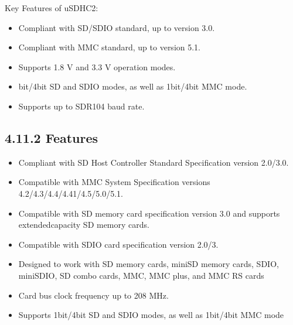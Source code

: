 \documentclass[letterpaper,10pt,openany,english]{sphinxmanual}
\begin{document}
\sphinxAtStartPar
Key Features of uSDHC2:
\begin{itemize}
\item {} 
\sphinxAtStartPar
Compliant with SD/SDIO standard, up to version 3.0.

\item {} 
\sphinxAtStartPar
Compliant with MMC standard, up to version 5.1.

\item {} 
\sphinxAtStartPar
Supports 1.8 V and 3.3 V operation modes.

\item {} 
\sphinxhyphen{}bit/4\sphinxhyphen{}bit SD and SDIO modes, as well as 1\sphinxhyphen{}bit/4\sphinxhyphen{}bit MMC mode.

\item {} 
\sphinxAtStartPar
Supports up to SDR104 baud rate.

\end{itemize}


\subsection{4.11.2 Features}
\label{\detokenize{hardware:id17}}\begin{itemize}
\item {} 
\sphinxAtStartPar
Compliant with SD Host Controller Standard Specification version 2.0/3.0.

\item {} 
\sphinxAtStartPar
Compatible with MMC System Specification versions 4.2/4.3/4.4/4.41/4.5/5.0/5.1.

\item {} 
\sphinxAtStartPar
Compatible with SD memory card specification version 3.0 and supports extended\sphinxhyphen{}capacity SD memory cards.

\item {} 
\sphinxAtStartPar
Compatible with SDIO card specification version 2.0/3.

\item {} 
\sphinxAtStartPar
Designed to work with SD memory cards, miniSD memory cards, SDIO, miniSDIO, SD combo cards, MMC, MMC plus, and MMC RS cards

\item {} 
\sphinxAtStartPar
Card bus clock frequency up to 208 MHz.

\item {} 
\sphinxAtStartPar
Supports 1\sphinxhyphen{}bit/4\sphinxhyphen{}bit SD and SDIO modes, as well as 1\sphinxhyphen{}bit/4\sphinxhyphen{}bit MMC mode

\end{itemize}
\end{document}
